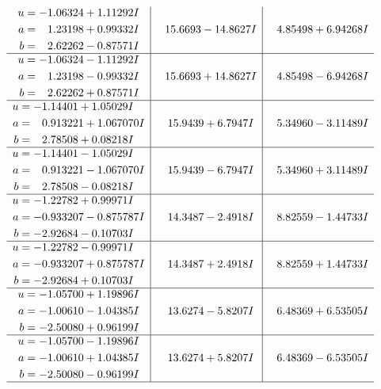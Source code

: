 \documentclass[1p]{elsarticle_modified}
\theoremstyle{definition}
\begin{document}
$$\begin{array}{c|c|c}
\begin{aligned}
u &= -1.06324 + 1.11292 I \\
a &= \phantom{-}1.23198 + 0.99332 I \\
b &= \phantom{-}2.62262 - 0.87571 I\end{aligned}
 & \phantom{-}15.6693 - 14.8627 I & \phantom{-}4.85498 + 6.94268 I \\ \hline\begin{aligned}
u &= -1.06324 - 1.11292 I \\
a &= \phantom{-}1.23198 - 0.99332 I \\
b &= \phantom{-}2.62262 + 0.87571 I\end{aligned}
 & \phantom{-}15.6693 + 14.8627 I & \phantom{-}4.85498 - 6.94268 I \\ \hline\begin{aligned}
u &= -1.14401 + 1.05029 I \\
a &= \phantom{-}0.913221 + 1.067070 I \\
b &= \phantom{-}2.78508 + 0.08218 I\end{aligned}
 & \phantom{-}15.9439 + 6.7947 I & \phantom{-}5.34960 - 3.11489 I \\ \hline\begin{aligned}
u &= -1.14401 - 1.05029 I \\
a &= \phantom{-}0.913221 - 1.067070 I \\
b &= \phantom{-}2.78508 - 0.08218 I\end{aligned}
 & \phantom{-}15.9439 - 6.7947 I & \phantom{-}5.34960 + 3.11489 I \\ \hline\begin{aligned}
u &= -1.22782 + 0.99971 I \\
a &= -0.933207 - 0.875787 I \\
b &= -2.92684 - 0.10703 I\end{aligned}
 & \phantom{-}14.3487 - 2.4918 I & \phantom{-}8.82559 - 1.44733 I \\ \hline\begin{aligned}
u &= -1.22782 - 0.99971 I \\
a &= -0.933207 + 0.875787 I \\
b &= -2.92684 + 0.10703 I\end{aligned}
 & \phantom{-}14.3487 + 2.4918 I & \phantom{-}8.82559 + 1.44733 I \\ \hline\begin{aligned}
u &= -1.05700 + 1.19896 I \\
a &= -1.00610 - 1.04385 I \\
b &= -2.50080 + 0.96199 I\end{aligned}
 & \phantom{-}13.6274 - 5.8207 I & \phantom{-}6.48369 + 6.53505 I \\ \hline\begin{aligned}
u &= -1.05700 - 1.19896 I \\
a &= -1.00610 + 1.04385 I \\
b &= -2.50080 - 0.96199 I\end{aligned}
 & \phantom{-}13.6274 + 5.8207 I & \phantom{-}6.48369 - 6.53505 I\\
 \hline 
 \end{array}$$\newpage\newpage\renewcommand{\arraystretch}{1}
\end{document}
